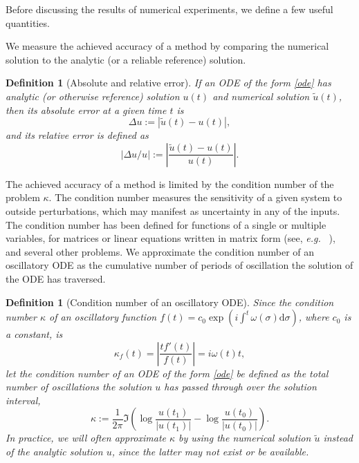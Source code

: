 \documentclass[10pt]{article}
\newcommand{\be}{\begin{equation}}
\newcommand{\ee}{\end{equation}}
\newcommand{\eg}{{\it e.g.\ }}
\newtheorem{defn}[thm]{Definition}
\newcommand{\om}{\omega}
\begin{document}
Before discussing the results of numerical experiments, we define a few useful quantities. 

We measure the achieved accuracy of a method by comparing the numerical
solution to the analytic (or a reliable reference) solution.
\begin{defn}[Absolute and relative error]\label{deltau}
    If an ODE of the form \cref{ode} has analytic (or otherwise reference) solution $u(t)$ and 
    numerical solution $\tilde{u}(t)$, then its absolute error at a given time $t$ is
    \be
    \Delta u := \left| \tilde{u}(t) - u(t)\right|,
    \ee
    and its relative error is defined as
    \be
    \left| \Delta u/u \right| := \left| \frac{\tilde{u}(t) - u(t)}{u(t)}\right|.
    \ee
\end{defn}

The achieved accuracy of a method is limited by the condition number of the
problem $\kappa$. The condition number measures the sensitivity of a given system to
outside perturbations, which may manifest as uncertainty in any of the inputs.
The condition number has been defined for functions of a single or multiple
variables, for matrices or linear equations written in matrix form (see, \eg
\cite{rice1966,trefethenlinalg}), and several other problems. We approximate
the condition number of an oscillatory ODE as the cumulative number of periods of
oscillation the solution of the ODE has traversed.
\begin{defn}[Condition number of an oscillatory ODE]\label{conditionnodef}
    Since the condition number $\kappa$ of an oscillatory function $f(t) =
    c_0\exp(i\int^t \om(\sigma)\mathrm{d}\sigma)$, where $c_0$ is a constant,
    is
    \begin{equation}\label{conditionno}
        \kappa_f(t) = \left| \frac{tf'(t)}{f(t)} \right| = i\om(t)t,
    \end{equation}
    let the condition number of an ODE of the form \cref{ode} be defined as the total number of oscillations the solution $u$ has passed through over the solution interval, 
    \begin{equation}
        \kappa := \frac{1}{2\pi}\Im\left(\log\frac{u(t_1)}{|u(t_1)|}  - \log\frac{u(t_0)}{|u(t_0)|}\right).
    \end{equation}
    In practice, we will often approximate $\kappa$ by using the numerical
    solution $\tilde{u}$ instead of the analytic solution $u$, since the latter may not
    exist or be available.
\end{defn}
\end{document}
